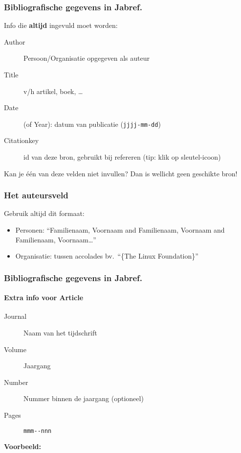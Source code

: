 \documentclass[aspectratio=169]{beamer}
\begin{document}
\begin{frame}
  \frametitle{Bibliografische gegevens in Jabref.}

  Info die \textbf{altijd} ingevuld moet worden:

  \begin{description}
    \item[Author] Persoon/Organisatie opgegeven als auteur
    \item[Title] v/h artikel, boek, \ldots
    \item[Date] (of Year): datum van publicatie (\texttt{jjjj-mm-dd})
    \item[Citationkey] id van deze bron, gebruikt bij refereren (tip: klik op sleutel-icoon)
  \end{description}

  \bigskip

  Kan je één van deze velden niet invullen? Dan is wellicht geen geschikte bron!
\end{frame}

\begin{frame}
  \frametitle{Het auteursveld}

  Gebruik altijd dit formaat:

  \begin{itemize}
    \item Personen: ``Familienaam, Voornaam and Familienaam, Voornaam and Familienaam, Voornaam\ldots''
    \item Organisatie: tussen accolades bv.\ ``\{The Linux Foundation\}''
  \end{itemize}

\end{frame}

\begin{frame}
  \frametitle{Bibliografische gegevens in Jabref.}
  \framesubtitle{Extra info voor Article}

  \begin{description}
    \item[Journal] Naam van het tijdschrift
    \item[Volume] Jaargang
    \item[Number] Nummer binnen de jaargang (optioneel)
    \item[Pages] \verb|mmm--nnn|
  \end{description}

  \bigskip

  \textbf{Voorbeeld:}

\end{frame}
\end{document}
